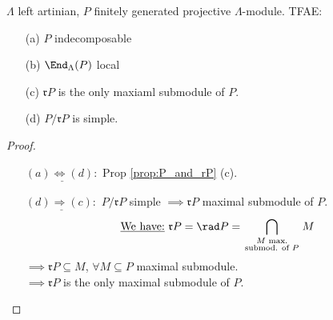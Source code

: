 \begin{prop}
\label{prop:local_iff_proj-indec}
$\Lambda$ left artinian, $P$ finitely generated projective $\Lambda$-module. TFAE:
\begin{enumerate}
\item[(a)] $P$ indecomposable
\item[(b)] $\End_\Lambda(P)$ local
\item[(c)] $\mathfrak{r}P$ is the only maxiaml submodule of $P$.
\item[(d)] $P/ \mathfrak{r}P$ is simple.
\end{enumerate}
\begin{proof}
\begin{enumerate}
\item[]
\item[$\underline{(a) \iff (d):}$] Prop \ref{prop:P_and_rP} (c).

\item[$\underline{(d) \Rightarrow (c):}$] $P/\mathfrak{r}P$ simple $\implies \mathfrak{r}P$ maximal submodule of $P$.\\
$$\text{\underline{We have:} } \mathfrak{r}P = \rad P = \bigcap_{\begin{smallmatrix} M \text{ max.} \\ \text{submod. of } P\end{smallmatrix}} M$$
$\implies \mathfrak{r}P \subseteq M$, $\forall M \subseteq P$ maximal submodule.\\
$\implies \mathfrak{r}P$ is the only maximal submodule of $P$.


\end{enumerate}
\end{proof}
\end{prop}
